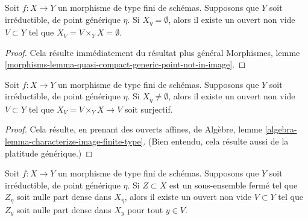 \begin{lemma}
\label{lemma-empty-generic-fibre}
Soit $f : X \to Y$ un morphisme de type fini de schémas. Supposons que
$Y$ soit irréductible, de point générique $\eta$. Si $X_\eta = \emptyset$,
alors il existe un ouvert non vide $V \subset Y$ tel que
$X_V = V \times_Y X = \emptyset$.
\end{lemma}

\begin{proof}
Cela résulte immédiatement du résultat plus général
Morphismes,
lemme \ref{morphisms-lemma-quasi-compact-generic-point-not-in-image}.
\end{proof}

\begin{lemma}
\label{lemma-nonempty-generic-fibre}
Soit $f : X \to Y$ un morphisme de type fini de schémas. Supposons que
$Y$ soit irréductible, de point générique $\eta$. Si $X_\eta \not = \emptyset$,
alors il existe un ouvert non vide $V \subset Y$ tel que
$X_V = V \times_Y X \to V$ soit surjectif.
\end{lemma}

\begin{proof}
Cela résulte, en prenant des ouverts affines, de
Algèbre, lemme \ref{algebra-lemma-characterize-image-finite-type}.
(Bien entendu, cela résulte aussi de la platitude générique.)
\end{proof}

\begin{lemma}
\label{lemma-nowhere-dense-generic-fibre}
Soit $f : X \to Y$ un morphisme de type fini de schémas. Supposons que
$Y$ soit irréductible, de point générique $\eta$.
Si $Z \subset X$ est un sous-ensemble fermé tel que $Z_\eta$ soit nulle part dense
dans $X_\eta$, alors il existe un ouvert non vide $V \subset Y$ tel
que $Z_y$ soit nulle part dense dans $X_y$ pour tout $y \in V$.
\end{lemma}

